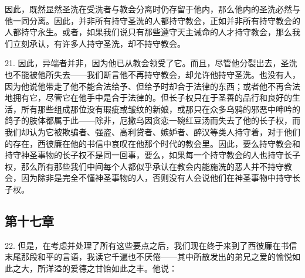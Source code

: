 因此，既然显然圣洗在受洗者与教会分离时仍存留于他内，那么他内的圣洗必然与他一同分离。因此，并非所有持守圣洗的人都持守教会，正如并非所有持守教会的人都持守永生。或者，如果我们说只有那些遵守天主诫命的人才持守教会，那么我们立刻承认，有许多人持守圣洗，却不持守教会。\par

21. 因此，异端者并非，因为他已从教会领受了它。而且，尽管他分裂出去，圣洗也不能被他所失去——我们断言他不再持守教会，却允许他持守圣洗。也没有人，因为他说他带走了他不能合法给予、但给予时却合于法律的东西；或者他不再合法地拥有它，尽管它在他手中是合于法律的。但长子权只在于圣善的品行和良好的生活，所有那些组成那位没有瑕疵或皱纹的新娘，或那只在众多乌鸦的邪恶中呻吟的鸽子的肢体都属于此——除非，厄撒乌因贪恋一碗红豆汤而失去了他的长子权，而我们却认为它被欺骗者、强盗、高利贷者、嫉妒者、醉汉等类人持守着，对于他们的存在，西彼廉在他的书信中哀叹在他那个时代的教会里。因此，要么持守教会和持守神圣事物的长子权不是同一回事，要么，如果每一个持守教会的人也持守长子权，那么所有那些我们中间每个人都似乎承认在教会内能施洗的恶人并不持守教会，因为除非是完全不懂神圣事物的人，否则没有人会说他们在神圣事物中持守长子权。\par


\subsection{第十七章}

22. 但是，在考虑并处理了所有这些要点之后，我们现在终于来到了西彼廉在书信末尾那段和平的言语，我读它千遍也不厌倦——其中所散发出的弟兄之爱的愉悦如此之大，所洋溢的爱德之甘饴如此之丰。他说：\par

